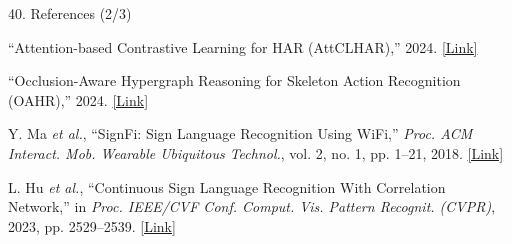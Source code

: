 \documentclass[aspectratio=169,11pt,xcolor=table]{beamer}
\begin{document}
\begin{frame}{40. References (2/3)}

\footnotesize
\color{black}
\raggedright

\begin{list}
    {}
    {
        \setlength{\leftmargin}{0.45cm}
        \setlength{\labelwidth}{0cm}
        \setlength{\labelsep}{0.10cm}
        \setlength{\itemsep}{8pt}
        \setlength{\parsep}{0pt}
        \setlength{\topsep}{0pt}
    }

\item[\textbf{[5]}]
``Attention-based Contrastive Learning for HAR (AttCLHAR),''
2024.
\hspace{2pt}
\href{https://pmc.ncbi.nlm.nih.gov/articles/PMC10857438/}
{\textcolor{AmritaMaroon}{[Link]}}

\item[\textbf{[6]}]
``Occlusion-Aware Hypergraph Reasoning for Skeleton Action Recognition
(OAHR),'' 2024.
\hspace{2pt}
\href{https://www.researchgate.net/publication/363910427_Revisiting_Skeleton-based_Action_Recognition}
{\textcolor{AmritaMaroon}{[Link]}}

\item[\textbf{[7]}]
Y. Ma \emph{et al.}, ``SignFi: Sign Language Recognition Using WiFi,''
\emph{Proc. ACM Interact. Mob. Wearable Ubiquitous Technol.},
vol. 2, no. 1, pp. 1--21, 2018.
\hspace{2pt}
\href{https://dl.acm.org/doi/10.1145/3191755}
{\textcolor{AmritaMaroon}{[Link]}}

\item[\textbf{[8]}]
L. Hu \emph{et al.}, ``Continuous Sign Language Recognition With
Correlation Network,'' in \emph{Proc. IEEE/CVF Conf. Comput. Vis.
Pattern Recognit. (CVPR)}, 2023, pp. 2529--2539.
\hspace{2pt}
\href{https://openaccess.thecvf.com/content/CVPR2023/html/Hu_Continuous_Sign_Language_Recognition_With_Correlation_Network_CVPR_2023_paper.html}
{\textcolor{AmritaMaroon}{[Link]}}

\end{list}

\end{frame}


\end{document}
